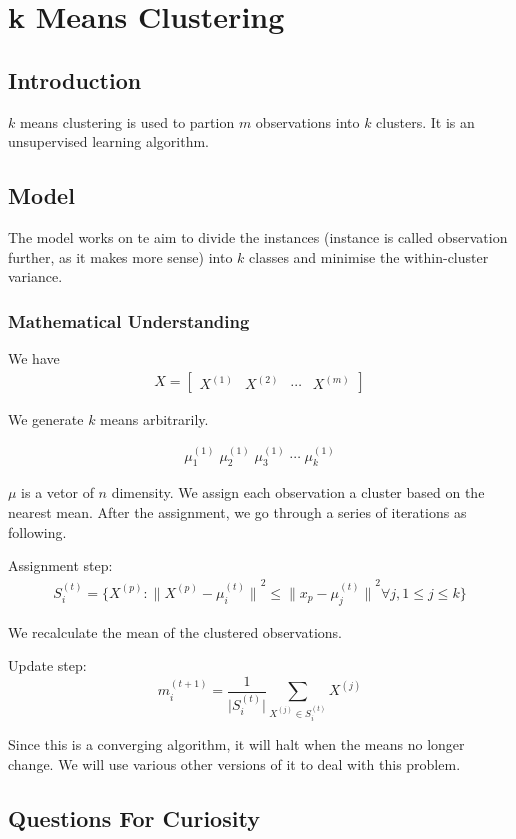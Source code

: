 
\chapter{k Means Clustering}
\label{chp:kmeans}

\section{Introduction}
$k$ means clustering is used to partion $m$ observations into $k$ clusters.
It is an unsupervised learning algorithm.

\section{Model}
The model works on te aim to divide the instances (instance is called observation further, as it makes more sense) into $k$ classes and
minimise the within-cluster variance.

\subsection{Mathematical Understanding}
We have 
\begin{align*}
    X = \begin{bmatrix}
        X^{(1)} & X^{(2)} & \cdots & X^{(m)}
    \end{bmatrix}
\end{align*}

We generate $k$ means arbitrarily.

\begin{align*}
    \mu_1^{(1)} \; \mu_2^{(1)} \; \mu_3^{(1)} \; \cdots \; \mu_k^{(1)}
\end{align*}

$\mu$ is a vetor of $n$ dimensity.
We assign each observation a cluster based on the nearest mean.
After the assignment, we go through a series of iterations as following.

Assignment step:
\begin{align}
    S_i^{(t)} = \bigl\{ X^{(p)} : {\bigl\|X^{(p)} - \mu_i^{(t)} \bigr\|}^2
    \leq {\bigl\|x_p - \mu_j^{(t)} \bigr\|}^2
    \forall j, 1\leq j \leq k
    \bigr\}
\end{align}

We recalculate the mean of the clustered observations.

Update step:
\begin{equation}
    m_i^{(t+1)} = \frac{1}{\lvert S_i^{(t)} \rvert } \sum_{X^{(j)} \in S_i^{(t)}} X^{(j)}
\end{equation}

Since this is a converging algorithm, it will halt when the means no longer change. We will use various other versions of it to deal with this problem.

\section{Questions For Curiosity}
